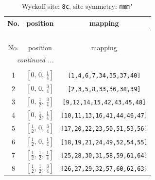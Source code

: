 \documentclass[fleqn,8pt]{jsarticle}
\begin{document}
\begin{longtable}{ccc}
\caption{Wyckoff site: {\tt 8c}, site symmetry: {\tt mmm'}}
 \\
 \hline \hline
No. & position & mapping \\ \hline \endfirsthead

\multicolumn{2}{l}{\tablename\ \thetable{}} \\
 \hline \hline
No. & position & mapping \\ \hline \endhead

 \hline \hline
\multicolumn{2}{r}{\footnotesize\it continued ...} \\ \endfoot

 \hline \hline
\multicolumn{2}{r}{} \\ \endlastfoot

1 & $\left[ 0,\, 0,\, \frac{1}{4} \right]$ & {\tt [1,4,6,7,34,35,37,40]} \\ \hline
2 & $\left[ 0,\, 0,\, \frac{3}{4} \right]$ & {\tt [2,3,5,8,33,36,38,39]} \\ \hline
3 & $\left[ 0,\, \frac{1}{2},\, \frac{3}{4} \right]$ & {\tt [9,12,14,15,42,43,45,48]} \\ \hline
4 & $\left[ 0,\, \frac{1}{2},\, \frac{1}{4} \right]$ & {\tt [10,11,13,16,41,44,46,47]} \\ \hline
5 & $\left[ \frac{1}{2},\, 0,\, \frac{3}{4} \right]$ & {\tt [17,20,22,23,50,51,53,56]} \\ \hline
6 & $\left[ \frac{1}{2},\, 0,\, \frac{1}{4} \right]$ & {\tt [18,19,21,24,49,52,54,55]} \\ \hline
7 & $\left[ \frac{1}{2},\, \frac{1}{2},\, \frac{1}{4} \right]$ & {\tt [25,28,30,31,58,59,61,64]} \\ \hline
8 & $\left[ \frac{1}{2},\, \frac{1}{2},\, \frac{3}{4} \right]$ & {\tt [26,27,29,32,57,60,62,63]} \\
\end{longtable}
\renewcommand{\arraystretch}{1.2}
\end{document}
